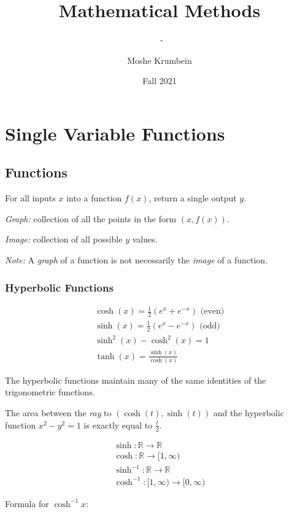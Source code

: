 \documentclass[00_complete]{subfiles}
\title{Mathematical Methods}
\author{Moshe Krumbein}
\date{Fall 2021}
\begin{document}
\setcounter{chapter}{3}

\chapter{Single Variable Functions}
\subtitle{\theauthor~- \thedate}
\section{Functions}

\begin{definition}
For all inputs $x$ into a function $f(x)$, return a single output $y$.

\emph{Graph:} collection of all the points in the form $(x,f(x))$.

\emph{Image:} collection of all possible $y$ values.

\emph{Note:} A \emph{graph} of a function is not necessarily the \emph{image} of a function.
\end{definition}

\subsection{Hyperbolic Functions}

$$
\begin{gathered}
    \cosh(x)=\frac{1}{2}\left(e^x+e^{-x}\right) \text{ (even)} \\
    \sinh(x)=\frac{1}{2}\left(e^x-e^{-x}\right) \text{ (odd)} \\
    \sinh^2(x)-\cosh^2(x) = 1\\
    \tanh(x) = \frac{\sinh(x)}{\cosh(x)}
\end{gathered}
$$

The hyperbolic functions maintain many of the same identities of the
trigonometric functions.

The area between the \emph{ray} to $(\cosh(t), \sinh(t))$ and the hyperbolic
function $x^2-y^2 = 1$ is exactly equal to $\frac{t}{2}$.

$$
\begin{gathered}
    \sinh: \mathbb{R} \to \mathbb{R} \\
    \cosh: \mathbb{R} \to [1, \infty) \\
    \sinh^{-1}: \mathbb{R} \to \mathbb{R} \\
    \cosh^{-1}: [1, \infty) \to [0, \infty)
\end{gathered}
$$

Formula for $\cosh^{-1}x$:
\end{document}
